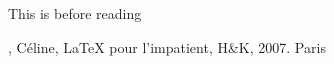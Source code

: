 \documentclass[a4paper]{article}
\begin{document}
  This is before reading \cite{Chevalier}
  \begin{thebibliography}{abcd}
   , Céline, LaTeX pour l'impatient,
   H\&K, 2007. Paris
  \end{thebibliography}
\end{document}
